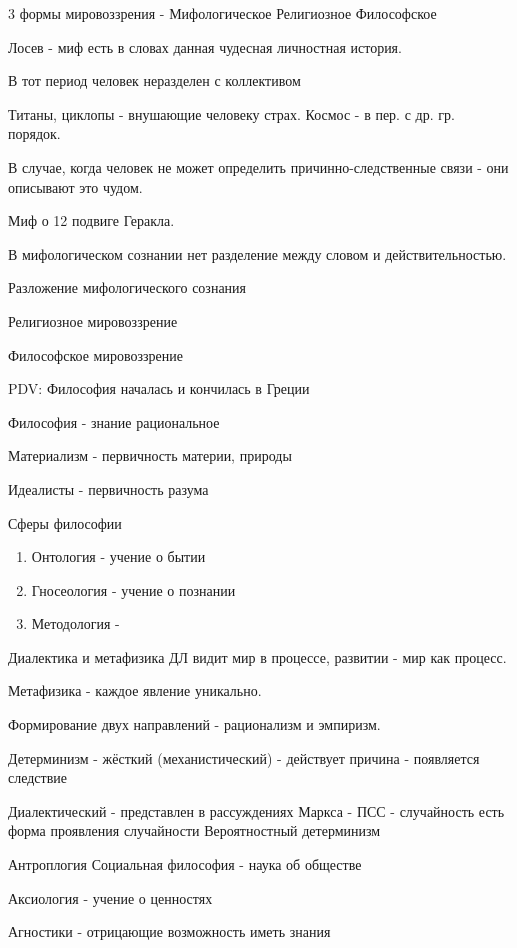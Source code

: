 \documentclass[a4paper,12pt]{report}
\begin{document}
	3 формы мировоззрения -
		Мифологическое
		Религиозное
		Философское


	Лосев - миф есть в словах данная чудесная личностная история.

	В тот период человек неразделен с коллективом

	Титаны, циклопы - внушающие человеку страх.
	Космос - в пер. с др. гр. порядок.

	В случае, когда человек не может определить причинно-следственные связи - они описывают это чудом.

		Миф о 12 подвиге Геракла.

		В мифологическом сознании нет разделение между словом и действительностью.



	Разложение мифологического сознания









	Религиозное мировоззрение









	Философское мировоззрение

	PDV: Философия началась и кончилась в Греции

	Философия - знание рациональное

	Материализм - первичность материи, природы

	Идеалисты - первичность разума

	Сферы философии
	\begin{enumerate}
		\item	Онтология - учение о бытии
		\item	Гносеология - учение о познании
		\item	Методология -
	\end{enumerate}

	Диалектика и метафизика
	ДЛ видит мир в процессе, развитии - мир как процесс.

	Метафизика - каждое явление уникально.

	Формирование двух направлений - рационализм и эмпиризм.


	Детерминизм - жёсткий (механистический)  - действует причина - появляется следствие

	Диалектический  - представлен в рассуждениях Маркса - ПСС - случайность есть форма проявления случайности
	Вероятностный детерминизм

	Антроплогия
	Социальная философия - наука об обществе

	Аксиология - учение о ценностях

	Агностики - отрицающие возможность иметь знания



\end{document}
